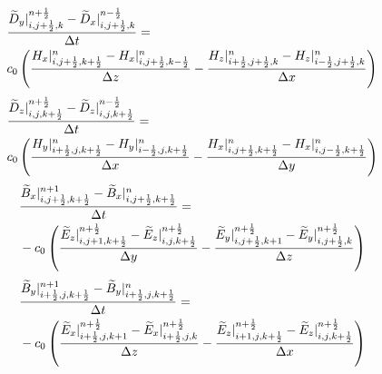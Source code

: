\begin{equation}
  \begin{split}
    \displaystyle & \frac{\widetilde{D}_y|_{i,j+\frac{1}{2},k}^{n+\frac{1}{2}} - \widetilde{D}_x|_{i,j+\frac{1}{2},k}^{n-\frac{1}{2}}}{\Delta t} = \\
    \displaystyle & c_0\left(\frac{H_x|_{i,j+\frac{1}{2},k+\frac{1}{2}}^{n} - H_x|_{i,j+\frac{1}{2},k-\frac{1}{2}}^{n}}{\Delta z} - \frac{H_z|_{i+\frac{1}{2},j+\frac{1}{2},k}^{n} - H_z|_{i-\frac{1}{2},j+\frac{1}{2},k}^{n}}{\Delta x}\right)\\
  \end{split}
\end{equation}
\begin{equation}
  \begin{split}
    \displaystyle & \frac{\widetilde{D}_z|_{i,j,k+\frac{1}{2}}^{n+\frac{1}{2}} - \widetilde{D}_z|_{i,j,k+\frac{1}{2}}^{n-\frac{1}{2}}}{\Delta t} = \\
    \displaystyle & c_0\left(\frac{H_y|_{i+\frac{1}{2},j,k+\frac{1}{2}}^{n} - H_y|_{i-\frac{1}{2},j,k+\frac{1}{2}}^{n}}{\Delta x} - \frac{H_x|_{i,j+\frac{1}{2},k+\frac{1}{2}}^{n} - H_x|_{i,j-\frac{1}{2},k+\frac{1}{2}}^{n}}{\Delta y}\right)\\
  \end{split}
\end{equation}
\begin{equation}
  \begin{split}
    \displaystyle & \frac{\widetilde{B}_x|_{i,j+\frac{1}{2},k+\frac{1}{2}}^{n+1} - \widetilde{B}_x|_{i,j+\frac{1}{2},k+\frac{1}{2}}^{n}}{\Delta t} = \\
    \displaystyle & - c_0\left(\frac{\widetilde{E}_z|_{i,j+1,k+\frac{1}{2}}^{n+\frac{1}{2}} - \widetilde{E}_z|_{i,j,k+\frac{1}{2}}^{n+\frac{1}{2}}}{\Delta y} - \frac{\widetilde{E}_y|_{i,j+\frac{1}{2},k+1}^{n+\frac{1}{2}} - \widetilde{E}_y|_{i,j+\frac{1}{2},k}^{n+\frac{1}{2}}}{\Delta z}\right)\\
  \end{split}
\end{equation}
\begin{equation}
  \begin{split}
    \displaystyle & \frac{\widetilde{B}_y|_{i+\frac{1}{2},j,k+\frac{1}{2}}^{n+1} - \widetilde{B}_y|_{i+\frac{1}{2},j,k+\frac{1}{2}}^{n}}{\Delta t} = \\
    \displaystyle & - c_0\left(\frac{\widetilde{E}_x|_{i+\frac{1}{2},j,k+1}^{n+\frac{1}{2}} - \widetilde{E}_x|_{i+\frac{1}{2},j,k}^{n+\frac{1}{2}}}{\Delta z} - \frac{\widetilde{E}_z|_{i+1,j,k+\frac{1}{2}}^{n+\frac{1}{2}} - \widetilde{E}_z|_{i,j,k+\frac{1}{2}}^{n+\frac{1}{2}}}{\Delta x}\right)\\
  \end{split}
\end{equation}
